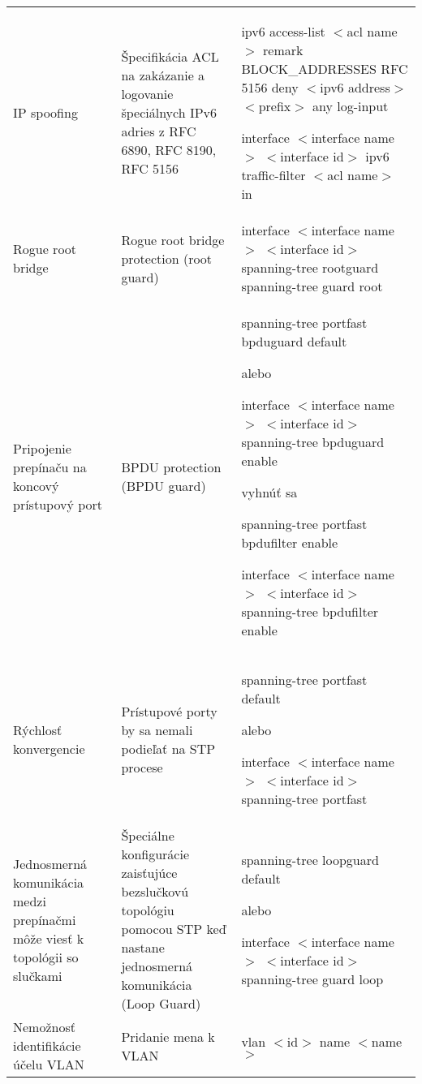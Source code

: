 \begin{longtable}[!htbp]{|L{10em}L{10em}L{34em}|}
	
	 IP spoofing	&Špecifikácia ACL na zakázanie a logovanie špeciálnych IPv6 adries z RFC 6890, RFC 8190, RFC 5156	&
	ipv6 access-list $<$acl name$>$
	remark BLOCK\_ADDRESSES RFC 5156
	deny $<$ipv6 address$>$ $<$prefix$>$ any log-input
	
	interface $<$interface name$>$ $<$interface id$>$
	ipv6 traffic-filter $<$acl name$>$ in\\
	Rogue root bridge 	&Rogue root bridge protection (root guard)	&interface $<$interface name$>$ $<$interface id$>$
	spanning-tree rootguard
	spanning-tree guard root\\
	
	
	
	
	 Pripojenie prepínaču na koncový prístupový port	&BPDU protection (BPDU guard)	&spanning-tree portfast bpduguard default
	
	alebo
	
	interface $<$interface name$>$ $<$interface id$>$
	spanning-tree bpduguard enable
	
	vyhnúť sa
	
	spanning-tree portfast bpdufilter enable
	
	interface $<$interface name$>$ $<$interface id$>$
	spanning-tree bpdufilter enable\\
	
	
	
	
	Rýchlosť konvergencie	&Prístupové porty by sa nemali podieľať na STP procese	&spanning-tree portfast default
	
	alebo
	
	interface $<$interface name$>$ $<$interface id$>$
	spanning-tree portfast\\
	
	
	
	
	 Jednosmerná komunikácia medzi prepínačmi môže viesť k topológii so slučkami	& Špeciálne konfigurácie zaisťujúce bezslučkovú topológiu pomocou STP keď nastane jednosmerná komunikácia (Loop Guard)	&spanning-tree loopguard default
	
	alebo 
	
	interface $<$interface name$>$ $<$interface id$>$
	spanning-tree guard loop\\
	
	
	
	
	Nemožnosť identifikácie účelu VLAN	&Pridanie mena k VLAN	&vlan $<$id$>$
	name $<$name$>$\\
	

\end{longtable}

